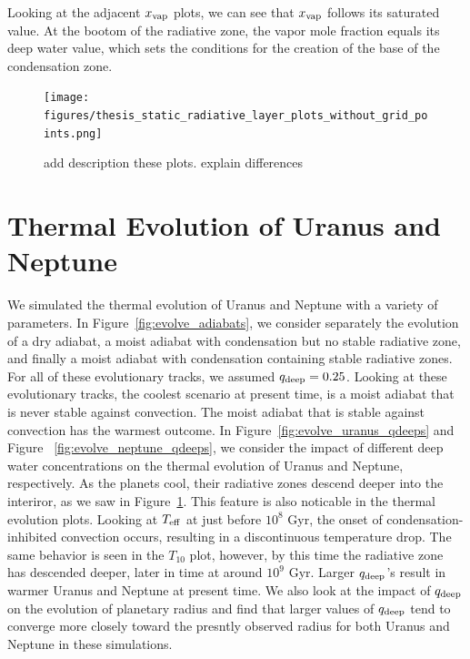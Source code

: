 \documentclass[11pt]{ucscthesisbs}
\begin{document}
Looking at the adjacent $x_{\rm vap}$ plots, we can see that $x_{\rm vap}$ follows its saturated value. At the bootom of the radiative zone, the vapor mole fraction equals its deep water value, which sets the conditions for the creation of the base of the condensation zone. 

\begin{figure}[ht]
 \centerline{
  \texttt{[image: figures/thesis\_static\_radiative\_layer\_plots\_without\_grid\_points.png]}
 }
\caption[Inhibition of convection on Uranus]
{add description these plots. explain differences}
\label{fig:radiative}
\end{figure}


\section{Thermal Evolution of Uranus and Neptune}

We simulated the thermal evolution of Uranus and Neptune with a variety of parameters. In Figure~\ref{fig:evolve_adiabats}, we consider separately the evolution of a dry adiabat, a moist adiabat with condensation but no stable radiative zone, and finally a moist adiabat with condensation containing stable radiative zones. For all of these evolutionary tracks, we assumed $q_{\rm deep} = 0.25$. Looking at these evolutionary tracks, the coolest scenario at present time, is a moist adiabat that is never stable against convection. The moist adiabat that is stable against convection has the warmest outcome. In Figure~\ref{fig:evolve_uranus_qdeeps} and Figure ~\ref{fig:evolve_neptune_qdeeps}, we consider the impact of different deep water concentrations on the thermal evolution of Uranus and Neptune, respectively. As the planets cool, their radiative zones descend deeper into the interiror, as we saw in Figure~\ref{fig:radiative}. This feature is also noticable in the thermal evolution plots. Looking at $T_{\rm eff}$ at just before $10^8$ Gyr, the onset of condensation-inhibited convection occurs, resulting in a discontinuous temperature drop. The same behavior is seen in the $T_{10}$ plot, however, by this time the radiative zone has descended deeper, later in time at around $10^9$ Gyr. Larger $q_{\rm deep}$'s result in warmer Uranus and Neptune at present time. We also look at the impact of $q_{\rm deep}$ on the evolution of planetary radius and find that larger values of $q_{\rm deep}$ tend to converge more closely toward the presntly observed radius for both Uranus and Neptune in these simulations.
\end{document}
